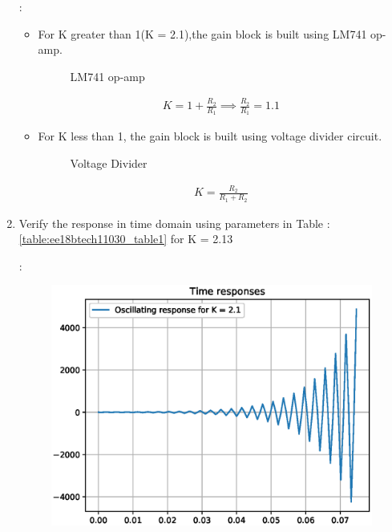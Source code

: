 \begin{enumerate}[label=\arabic*.,ref=\theenumi]
\solution :

\begin{itemize}
\item For K greater than 1(K = 2.1),the gain block is built using LM741 op-amp.
\begin{figure}[!ht]
	\begin{center}
		\resizebox{\columnwidth/1}{!}{}
	\end{center}
	\caption{LM741 op-amp}
	\label{fig:ee18btech11030_fig5}
\end{figure}
\begin{align}
K = 1 + \frac{R_2}{R_1}
\implies \frac{R_2}{R_1} = 1.1
\end{align}
\item For K less than 1, the gain block is built using voltage divider circuit.
\begin{figure}[!ht]
	\begin{center}
		\resizebox{\columnwidth/1}{!}{}
	\end{center}
	\caption{Voltage Divider}
	\label{fig:ee18btech11030_fig6}
\end{figure}
\begin{align}
K = \frac{R_2}{R_1+R_2}
\end{align}
\end{itemize}

\item Verify the response in time domain using parameters in Table : \ref{table:ee18btech11030_table1} for K = 2.13

\solution :
\begin{figure}[!ht]
\centering
  \includegraphics[width=\columnwidth]{./figs/ee18btech11030/ee18btech11030_fc2.eps}
\caption{}
\label{fig:ee18btech11030_fig7} 
\end{figure}


\end{enumerate}
